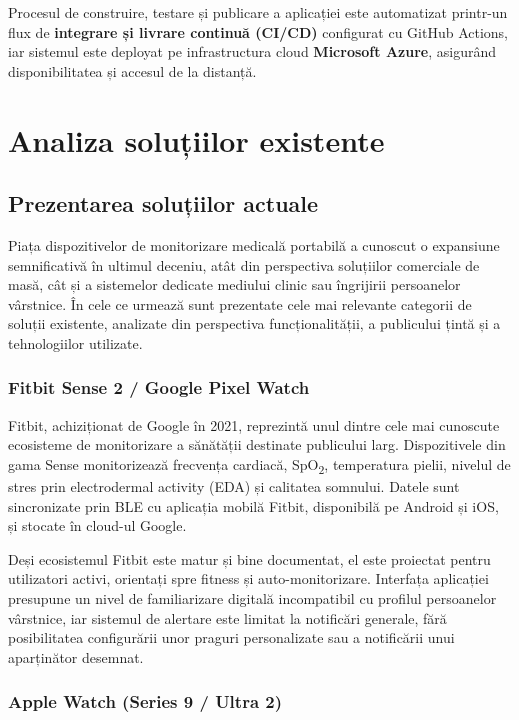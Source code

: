 ﻿\documentclass[12pt,a4paper,twoside]{article}
\newcommand{\spo}{SpO\textsubscript{2}}
\begin{document}
Procesul de construire, testare și publicare a aplicației este automatizat printr-un flux de \textbf{integrare și livrare continuă (CI/CD)} configurat cu GitHub Actions, iar sistemul este deployat pe infrastructura cloud \textbf{Microsoft Azure}, asigurând disponibilitatea și accesul de la distanță.

\newpage
\section{Analiza soluțiilor existente}

\subsection{Prezentarea soluțiilor actuale}

Piața dispozitivelor de monitorizare medicală portabilă a cunoscut o expansiune semnificativă în ultimul deceniu, atât din perspectiva soluțiilor comerciale de masă, cât și a sistemelor dedicate mediului clinic sau îngrijirii persoanelor vârstnice. În cele ce urmează sunt prezentate cele mai relevante categorii de soluții existente, analizate din perspectiva funcționalității, a publicului țintă și a tehnologiilor utilizate.

\subsubsection{Fitbit Sense 2 / Google Pixel Watch}

Fitbit, achiziționat de Google în 2021, reprezintă unul dintre cele mai cunoscute ecosisteme de monitorizare a sănătății destinate publicului larg. Dispozitivele din gama Sense monitorizează frecvența cardiacă, \spo, temperatura pielii, nivelul de stres prin electrodermal activity (EDA) și calitatea somnului. Datele sunt sincronizate prin BLE cu aplicația mobilă Fitbit, disponibilă pe Android și iOS, și stocate în cloud-ul Google.

Deși ecosistemul Fitbit este matur și bine documentat, el este proiectat pentru utilizatori activi, orientați spre fitness și auto-monitorizare. Interfața aplicației presupune un nivel de familiarizare digitală incompatibil cu profilul persoanelor vârstnice, iar sistemul de alertare este limitat la notificări generale, fără posibilitatea configurării unor praguri personalizate sau a notificării unui aparținător desemnat.

\subsubsection{Apple Watch (Series 9 / Ultra 2)}
\end{document}
